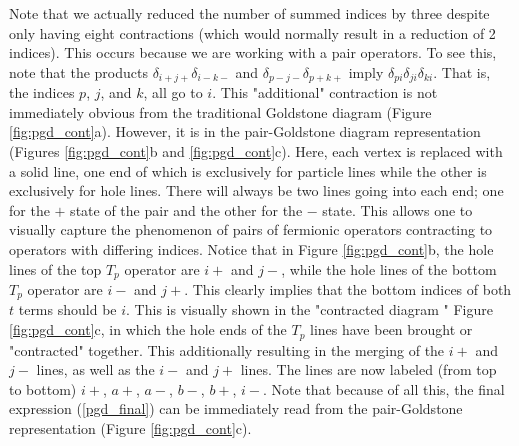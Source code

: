 \documentclass[Dual]{msu-thesis}
\begin{document}
Note that we actually reduced the number of summed indices by three despite only having eight contractions (which would normally result in a reduction of 2 indices). This occurs because we are working with a pair operators. To see this, note that the products $\delta_{i+j+}\delta_{i-k-}$ and $\delta_{p-j-}\delta_{p+k+}$ imply $\delta_{pi}\delta_{ji}\delta_{ki}$. That is, the indices $p$, $j$, and $k$, all go to $i$. This "additional" contraction is not immediately obvious from the traditional Goldstone diagram (Figure \ref{fig:pgd_cont}a). However, it is in the pair-Goldstone diagram representation (Figures \ref{fig:pgd_cont}b and \ref{fig:pgd_cont}c). Here, each vertex is replaced with a solid line, one end of which is exclusively for particle lines while the other is exclusively for hole lines. There will always be two lines going into each end; one for the $+$ state of the pair and the other for the $-$ state. This allows one to visually capture the phenomenon of pairs of fermionic operators contracting to operators with differing indices. Notice that in Figure \ref{fig:pgd_cont}b, the hole lines of the top $T_p$ operator are $i+$ and $j-$, while the hole lines of the bottom $T_p$ operator are $i-$ and $j+$. This clearly implies that the bottom indices of both $t$ terms should be $i$. This is visually shown in the "contracted diagram " Figure \ref{fig:pgd_cont}c, in which the hole ends of the $T_p$ lines have been brought or "contracted" together. This additionally resulting in the merging of the $i+$ and $j-$ lines, as well as the $i-$ and $j+$ lines. The lines are now labeled (from top to bottom) $i+$, $a+$, $a-$, $b-$, $b+$, $i-$. Note that because of all this, the final expression (\ref{pgd_final}) can be immediately read from the pair-Goldstone representation (Figure \ref{fig:pgd_cont}c).
\end{document}
